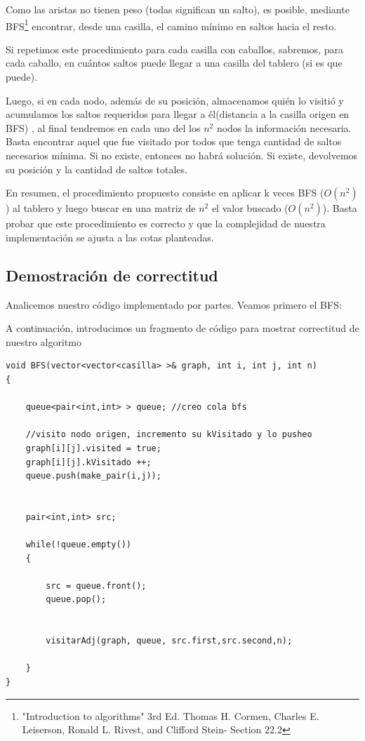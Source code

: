 \documentclass[11pt, a4paper, twoside]{article}
\begin{document}
Como las aristas no tienen peso (todas significan un salto), es posible, mediante BFS\footnote{"Introduction to algorithms" 3rd Ed. Thomas H. Cormen, Charles E. Leiserson, Ronald L. Rivest, and Clifford Stein- Section 22.2} encontrar, desde una casilla, el camino mínimo en saltos hacia el resto.  

Si repetimos este procedimiento para cada casilla con caballos, sabremos, para cada caballo, en cuántos saltos puede llegar a una casilla del tablero (si es que puede). 

Luego, si en cada nodo, además de su posición, almacenamos quién lo visitió y acumulamos los saltos requeridos para llegar a él(distancia a la casilla origen en BFS) , al final tendremos en cada uno del los $n^2$ nodos la información necesaria. Basta encontrar aquel que fue visitado por todos que tenga cantidad de saltos necesarios mínima. Si no existe, entonces no habrá solución. Si existe, devolvemos su posición y la cantidad de saltos totales.

En resumen, el procedimiento propuesto consiste en aplicar k veces BFS ($O(n^2)$) al tablero y luego buscar en una matriz de $n^2$ el valor buscado ($O(n^2)$). Basta probar que este procedimiento es correcto y que la complejidad de nuestra implementación se ajusta a las cotas planteadas.

\subsection{Demostración de correctitud}
Analicemos nuestro código implementado por partes. Veamos primero el BFS:

A continuación, introducimos un fragmento de código para mostrar correctitud de nuestro algoritmo

\begin{verbatim}
void BFS(vector<vector<casilla> >& graph, int i, int j, int n) 
{

    queue<pair<int,int> > queue; //creo cola bfs

    //visito nodo origen, incremento su kVisitado y lo pusheo
    graph[i][j].visited = true;
    graph[i][j].kVisitado ++;
    queue.push(make_pair(i,j));


	pair<int,int> src;

    while(!queue.empty())
    {
      
        src = queue.front();
        queue.pop();

       
		visitarAdj(graph, queue, src.first,src.second,n);

    }
}

\end{verbatim}
\end{document}
